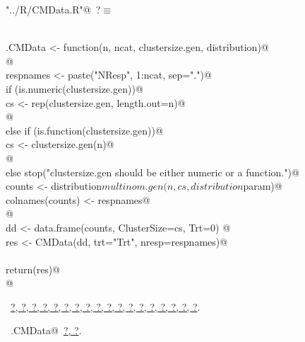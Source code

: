 \documentclass[reqno]{amsart}
\renewcommand{\NWtarget}[2]{\hypertarget{#1}{#2}}
\renewcommand{\NWlink}[2]{\hyperlink{#1}{#2}}
\begin{document}
\begin{flushleft} \small\label{scrap9}\raggedright\small
\NWtarget{nuweb?}{} \verb@"../R/CMData.R"@\nobreak\ {\footnotesize {?}}$\equiv$
\vspace{-1ex}
\begin{list}{}{} \item
\mbox{}\verb@@\\
\mbox{}\verb@ran.CMData <- function(n, ncat, clustersize.gen, distribution){@\\
\mbox{}\verb@  @\\
\mbox{}\verb@  respnames <- paste("NResp", 1:ncat, sep=".")@\\
\mbox{}\verb@  if (is.numeric(clustersize.gen)){@\\
\mbox{}\verb@    cs <- rep(clustersize.gen, length.out=n)@\\
\mbox{}\verb@  }@\\
\mbox{}\verb@  else if (is.function(clustersize.gen)){@\\
\mbox{}\verb@    cs <- clustersize.gen(n)@\\
\mbox{}\verb@  }@\\
\mbox{}\verb@  else stop("clustersize.gen should be either numeric or a function.")@\\
\mbox{}\verb@  counts <- distribution$multinom.gen(n, cs, distribution$param)@\\
\mbox{}\verb@  colnames(counts) <- respnames@\\
\mbox{}\verb@  @\\
\mbox{}\verb@  dd <- data.frame(counts, ClusterSize=cs, Trt=0)  @\\
\mbox{}\verb@  res <- CMData(dd, trt="Trt", nresp=respnames)@\\
\mbox{}\verb@@\\
\mbox{}\verb@  return(res)@\\
\mbox{}\verb@}@\\
\mbox{}\verb@@{\NWsep}
\end{list}
\vspace{-1.5ex}
\footnotesize
\begin{list}{}{\setlength{\itemsep}{-\parsep}\setlength{\itemindent}{-\leftmargin}}
\item \NWtxtFileDefBy\ \NWlink{nuweb?}{?}\NWlink{nuweb?}{, ?}\NWlink{nuweb?}{, ?}\NWlink{nuweb?}{, ?}\NWlink{nuweb?}{, ?}\NWlink{nuweb?}{, ?}\NWlink{nuweb?}{, ?}\NWlink{nuweb?}{, ?}\NWlink{nuweb?}{, ?}\NWlink{nuweb?}{, ?}\NWlink{nuweb?}{, ?}\NWlink{nuweb?}{, ?}\NWlink{nuweb?}{, ?}\NWlink{nuweb?}{, ?}\NWlink{nuweb?}{, ?}\NWlink{nuweb?}{, ?}\NWlink{nuweb?}{, ?}\NWlink{nuweb?}{, ?}.
\item \NWtxtIdentsDefed\nobreak\  \verb@ran.CMData@\nobreak\ \NWlink{nuweb?}{?}\NWlink{nuweb?}{, ?}.
\item{}
\end{list}
\vspace{4ex}
\end{flushleft}
\end{document}
